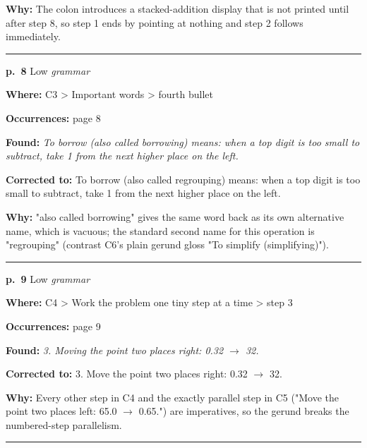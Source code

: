 \documentclass[11pt]{article}
\newcommand{\sevlow}[1]{\textcolor{black!55}{#1}}
\begin{document}
\noindent\textbf{Why: }The colon introduces a stacked-addition display that is not printed until after step 8, so step 1 ends by pointing at nothing and step 2 follows immediately.\par\vspace{4pt}
\noindent\rule{\textwidth}{0.4pt}\par\nobreak\vspace{2pt}
\noindent\textbf{p.~8} \quad \sevlow{Low} \quad \textit{grammar}\par
\noindent\textbf{Where: }C3 > Important words > fourth bullet\par
\noindent\textbf{Occurrences: }page 8\par
\noindent\textbf{Found: }\textit{To borrow (also called borrowing) means: when a top digit is too small to subtract, take 1 from the next higher place on the left.}\par
\noindent\textbf{Corrected to: }To borrow (also called regrouping) means: when a top digit is too small to subtract, take 1 from the next higher place on the left.\par
\noindent\textbf{Why: }"also called borrowing" gives the same word back as its own alternative name, which is vacuous; the standard second name for this operation is "regrouping" (contrast C6's plain gerund gloss "To simplify (simplifying)").\par\vspace{4pt}
\noindent\rule{\textwidth}{0.4pt}\par\nobreak\vspace{2pt}
\noindent\textbf{p.~9} \quad \sevlow{Low} \quad \textit{grammar}\par
\noindent\textbf{Where: }C4 > Work the problem one tiny step at a time > step 3\par
\noindent\textbf{Occurrences: }page 9\par
\noindent\textbf{Found: }\textit{3. Moving the point two places right: 0.32 $\to$ 32.}\par
\noindent\textbf{Corrected to: }3. Move the point two places right: 0.32 $\to$ 32.\par
\noindent\textbf{Why: }Every other step in C4 and the exactly parallel step in C5 ("Move the point two places left: 65.0 $\to$ 0.65.") are imperatives, so the gerund breaks the numbered-step parallelism.\par\vspace{4pt}
\noindent\rule{\textwidth}{0.4pt}\par\nobreak\vspace{2pt}
\end{document}
